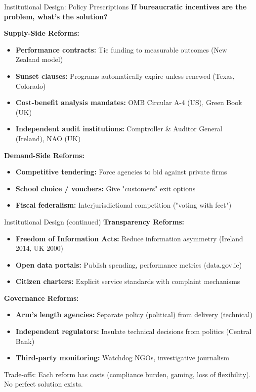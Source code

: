 \documentclass[10pt]{beamer}
\begin{document}
\begin{frame}{Institutional Design: Policy Prescriptions}
\textbf{If bureaucratic incentives are the problem, what's the solution?}


\textbf{Supply-Side Reforms:}
\begin{itemize}
\item \textbf{Performance contracts:} Tie funding to measurable outcomes (New Zealand model)
\item \textbf{Sunset clauses:} Programs automatically expire unless renewed (Texas, Colorado)
\item \textbf{Cost-benefit analysis mandates:} OMB Circular A-4 (US), Green Book (UK)
\item \textbf{Independent audit institutions:} Comptroller \& Auditor General (Ireland), NAO (UK)
\end{itemize}


\textbf{Demand-Side Reforms:}
\begin{itemize}
\item \textbf{Competitive tendering:} Force agencies to bid against private firms
\item \textbf{School choice / vouchers:} Give "customers" exit options
\item \textbf{Fiscal federalism:} Interjurisdictional competition ("voting with feet")
\end{itemize}
\end{frame}

\begin{frame}{Institutional Design (continued)}
\textbf{Transparency Reforms:}
\begin{itemize}
\item \textbf{Freedom of Information Acts:} Reduce information asymmetry (Ireland 2014, UK 2000)
\item \textbf{Open data portals:} Publish spending, performance metrics (data.gov.ie)
\item \textbf{Citizen charters:} Explicit service standards with complaint mechanisms
\end{itemize}


\textbf{Governance Reforms:}
\begin{itemize}
\item \textbf{Arm's length agencies:} Separate policy (political) from delivery (technical)
\item \textbf{Independent regulators:} Insulate technical decisions from politics (Central Bank)
\item \textbf{Third-party monitoring:} Watchdog NGOs, investigative journalism
\end{itemize}


\alert{Trade-offs:} Each reform has costs (compliance burden, gaming, loss of flexibility). No perfect solution exists.
\end{frame}
\end{document}
